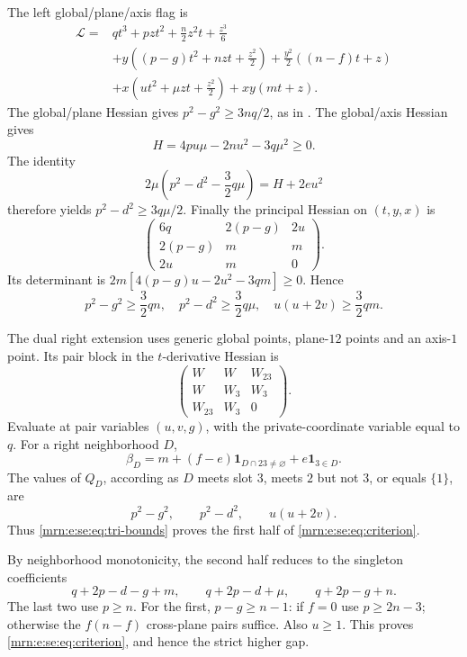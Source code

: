 \documentclass[11pt,a4paper]{article}
\theoremstyle{remark}\newtheorem{remark}[theorem]{Remark}
\newcommand{\ind}{\mathbf1}                %
\begin{document}
The left global/plane/axis flag is
\begin{align*}
 \mathcal L={}&qt^3+pzt^2+\frac n2z^2t+\frac{z^3}{6}\\
 &+y\left((p-g)t^2+nzt+\frac{z^2}{2}\right)
    +\frac{y^2}{2}((n-f)t+z)\\
 &+x\left(ut^2+\mu zt+\frac{z^2}{2}\right)
    +xy(mt+z).
\end{align*}
The global/plane Hessian gives $p^2-g^2\ge3nq/2$, as in \cite{b:m32}. The global/axis Hessian gives
\[
 H=4pu\mu-2nu^2-3q\mu^2\ge0.
\]
The identity
\[
 2\mu\left(p^2-d^2-\frac32q\mu\right)=H+2eu^2
\]
therefore yields $p^2-d^2\ge3q\mu/2$. Finally the principal Hessian on $(t,y,x)$ is
\[
 \begin{pmatrix}6q&2(p-g)&2u\\2(p-g)&m&m\\2u&m&0\end{pmatrix}.
\]
Its determinant is $2m[4(p-g)u-2u^2-3qm]\ge0$. Hence
\begin{equation}\label{mrn:e:se:eq:tri-bounds}
 p^2-g^2\ge\frac32qn,\quad
 p^2-d^2\ge\frac32q\mu,\quad
 u(u+2v)\ge\frac32qm.
\end{equation}

The dual right extension uses generic global points, plane-$12$ points and an axis-$1$ point. Its pair block in the $t$-derivative Hessian is
\[
 \begin{pmatrix}W&W&W_{23}\\W&W_3&W_3\\W_{23}&W_3&0\end{pmatrix}.
\]
Evaluate at pair variables $(u,v,g)$, with the private-coordinate variable equal to $q$. For a right neighborhood $D$,
\[
 \beta_D=m+(f-e)\ind_{D\cap23\ne\varnothing}+e\ind_{3\in D}.
\]
The values of $Q_D$, according as $D$ meets slot $3$, meets $2$ but not $3$, or equals $\{1\}$, are
\[
 p^2-g^2,\qquad p^2-d^2,\qquad u(u+2v).
\]
Thus \eqref{mrn:e:se:eq:tri-bounds} proves the first half of \eqref{mrn:e:se:eq:criterion}.

By neighborhood monotonicity, the second half reduces to the singleton coefficients
\[
 q+2p-d-g+m,\qquad q+2p-d+\mu,\qquad q+2p-g+n.
\]
The last two use $p\ge n$. For the first, $p-g\ge n-1$: if $f=0$ use $p\ge2n-3$; otherwise the $f(n-f)$ cross-plane pairs suffice. Also $u\ge1$. This proves \eqref{mrn:e:se:eq:criterion}, and hence the strict higher gap.
\end{document}
